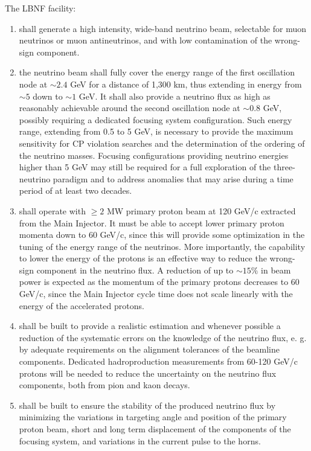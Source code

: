 The LBNF facility:
\begin{enumerate} 
\item shall generate a high intensity, wide-band neutrino beam, selectable for muon neutrinos or muon antineutrinos, and with low contamination of the wrong-sign component.
\item the neutrino beam shall fully cover the energy range of the first oscillation node at $\sim 2.4$ GeV for a distance of 1,300 km, thus extending in energy from $\sim 5$ down to $\sim 1$ GeV. It shall also provide a neutrino flux as high as reasonably achievable around the second oscillation node at $\sim 0.8$ GeV, possibly requiring a dedicated focusing system configuration. Such energy range, extending from 0.5 to 5 GeV, is necessary to provide the maximum sensitivity for CP violation searches and the determination of the ordering of the neutrino masses. Focusing configurations providing neutrino energies higher than 5 GeV may still be required for a full exploration of the three-neutrino paradigm and to address anomalies that may arise during a time period of at least two decades. 
\item shall operate with $\geq 2$ MW primary proton beam at 120 GeV/c extracted from the Main Injector. It must be able to accept lower primary proton momenta down to 60 GeV/c, since this will provide some optimization in the tuning of the energy range of the neutrinos. More importantly, the capability to lower the energy of the protons is an effective way to reduce the wrong-sign component in the neutrino flux. A reduction of up to $\sim 15 \%$ in beam power is expected as the momentum of the primary protons decreases to 60 GeV/c, since the Main Injector cycle time does not scale linearly with the energy of the accelerated protons.
\item shall be built to provide a realistic estimation and whenever possible a reduction of the systematic errors on the knowledge of the neutrino flux, e. g. by adequate requirements on the alignment tolerances of the beamline components. Dedicated hadroproduction measurements from 60-120 GeV/c protons will be needed to reduce the uncertainty on the neutrino flux components, both from pion and kaon decays. 
\item shall be built to ensure the stability of the produced neutrino flux by minimizing the variations in targeting angle and position of the primary proton beam, short and long term displacement of the components of the focusing system, and variations in the current pulse to the horns.
\end{enumerate}

